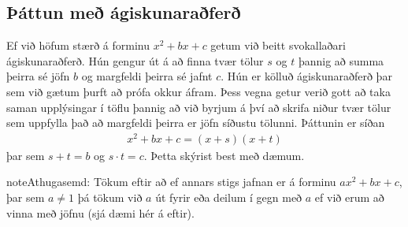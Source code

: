 \documentclass[a4paper,10pt,icelandic]{sphinxmanual}
\begin{document}
\subsection{Þáttun með ágiskunaraðferð}
\label{\detokenize{Kafli02:attun-me-agiskunarafer}}
Ef við höfum stærð á forminu \(x^2+bx+c\) getum við beitt svokallaðari ágiskunaraðferð. Hún gengur út á að finna tvær tölur \(s\) og \(t\) þannig að summa þeirra sé jöfn \(b\) og margfeldi þeirra sé jafnt \(c\). Hún er kölluð ágiskunaraðferð þar sem við gætum þurft að prófa okkur áfram. Þess vegna getur verið gott að taka saman upplýsingar í töflu þannig að við byrjum á því að skrifa niður tvær tölur sem uppfylla það að margfeldi þeirra er jöfn síðustu tölunni. Þáttunin er síðan
\begin{equation*}
\begin{split}x^2+bx+c=(x+s)(x+t)\end{split}
\end{equation*}
þar sem \(s+t=b\) og \(s\cdot t =c\).
Þetta skýrist best með dæmum.

\begin{sphinxadmonition}{note}{Athugasemd:}
Tökum eftir að ef annars stigs jafnan er á forminu \(ax^2+bx+c\), þar sem \(a\neq 1\) þá tökum við \(a\) út fyrir eða deilum í gegn með \(a\) ef við erum að vinna með jöfnu (sjá dæmi  hér á eftir).
\end{sphinxadmonition}
\end{document}
